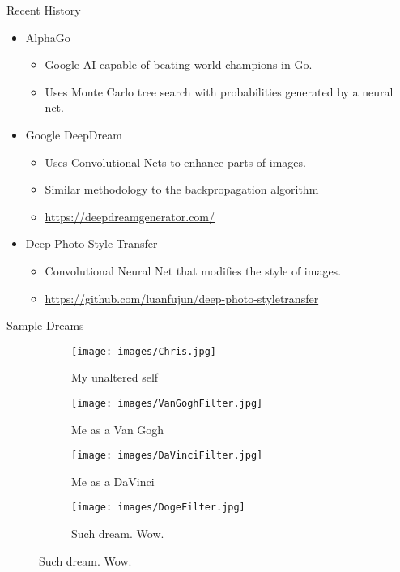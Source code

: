 \documentclass[11pt]{beamer}
\begin{document}
\begin{frame}{Recent History}
\begin{itemize}
    \item AlphaGo
    \begin{itemize}
        \item Google AI capable of beating world champions in Go.
        \item Uses Monte Carlo tree search with probabilities generated by a neural net.
    \end{itemize}
    \item Google DeepDream
    \begin{itemize}
        \item Uses Convolutional Nets to enhance parts of images.
        \item Similar methodology to the backpropagation algorithm
        \item \url{https://deepdreamgenerator.com/}
    \end{itemize}
    \item Deep Photo Style Transfer
    \begin{itemize}
        \item Convolutional Neural Net that modifies the style of images.
        \item \url{https://github.com/luanfujun/deep-photo-styletransfer}
    \end{itemize}
\end{itemize}
\end{frame}

\begin{frame}{Sample Dreams}
\begin{figure}
\centering
\begin{subfigure}[b]{.45\linewidth}
\texttt{[image: images/Chris.jpg]}
\caption{My unaltered self}\label{fig:chris}
\end{subfigure}
\begin{subfigure}[b]{.45\linewidth}
\texttt{[image: images/VanGoghFilter.jpg]}
\caption{Me as a Van Gogh}\label{fig:vangogh}
\end{subfigure}
\begin{subfigure}[b]{.45\linewidth}
\texttt{[image: images/DaVinciFilter.jpg]}
\caption{Me as a DaVinci}\label{fig:davinci}
\end{subfigure}
\begin{subfigure}[b]{.45\linewidth}
\texttt{[image: images/DogeFilter.jpg]}
\caption{Such dream. Wow.}\label{fig:davinci}
\end{subfigure}
\label{fig:dreams}
\end{figure}
\end{frame}
\end{document}
